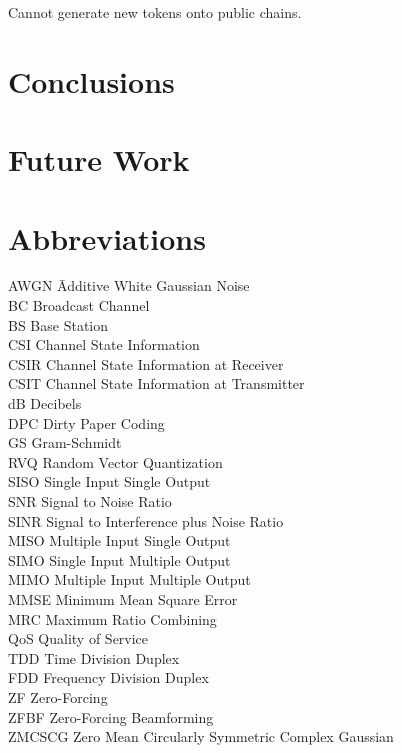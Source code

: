 \documentclass[a4paper,twoside,phd]{BYUPhys}
\begin{document}
Cannot generate new tokens onto public chains.
\chapter{Conclusions}
\chapter{Future Work}
\chapter{Abbreviations}
\label{chap:abbreviations}

\begin{tabbing}

AWGN \qquad \qquad \= Additive White Gaussian Noise\\
BC \> Broadcast Channel\\
BS \> Base Station\\
CSI \> Channel State Information\\
CSIR \> Channel State Information at Receiver\\
CSIT \> Channel State Information at Transmitter\\
dB \> Decibels\\
DPC \> Dirty Paper Coding\\
GS \> Gram-Schmidt\\
RVQ \> Random Vector Quantization\\
SISO \> Single Input Single Output\\
SNR \> Signal to Noise Ratio\\
SINR \> Signal to Interference plus Noise Ratio\\
MISO \> Multiple Input Single Output\\
SIMO \> Single Input Multiple Output\\
MIMO \> Multiple Input Multiple Output\\
MMSE \> Minimum Mean Square Error\\
MRC \> Maximum Ratio Combining\\ 
QoS \> Quality of Service\\
TDD \> Time Division Duplex\\
FDD \> Frequency Division Duplex\\
ZF \> Zero-Forcing\\
ZFBF \> Zero-Forcing Beamforming\\
ZMCSCG \> Zero Mean Circularly Symmetric Complex Gaussian\\

\end{tabbing}
\end{document}
